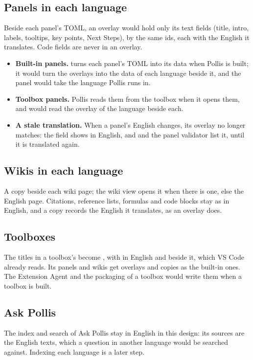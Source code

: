 \subsection{Panels in each language}
Beside each panel's TOML, an overlay  would hold only its text fields (title, intro,
labels, tooltips, key points, Next Steps), by the same ids, each with the English it translates. Code fields are never
in an overlay.
\begin{itemize}
  \item \textbf{Built-in panels.}  turns each panel's TOML into its data when Pollis is built; it
    would turn the overlays into the data of each language beside it, and the panel would take the language Pollis
    runs in.
  \item \textbf{Toolbox panels.} Pollis reads them from the toolbox when it opens them, and would read the overlay of
    the language beside each.
  \item \textbf{A stale translation.} When a panel's English changes, its overlay no longer matches: the field shows in
    English, and  and the panel validator list it, until it is translated again.
\end{itemize}

\subsection{Wikis in each language}
A copy  beside each wiki page; the wiki view opens it when there is one, else the English page.
Citations, reference lists, formulas and code blocks stay as in English, and a copy records the English it translates,
as an overlay does.

\subsection{Toolboxes}
The titles in a toolbox's  become , with  in English and
 beside it, which VS Code already reads. Its panels and wikis get overlays and copies as the
built-in ones. The Extension Agent and the packaging of a toolbox would write them when a toolbox is built.

\subsection{Ask Pollis}
The index and search of Ask Pollis stay in English in this design: its sources are the English texts, which a question
in another language would be searched against. Indexing each language is a later step.

